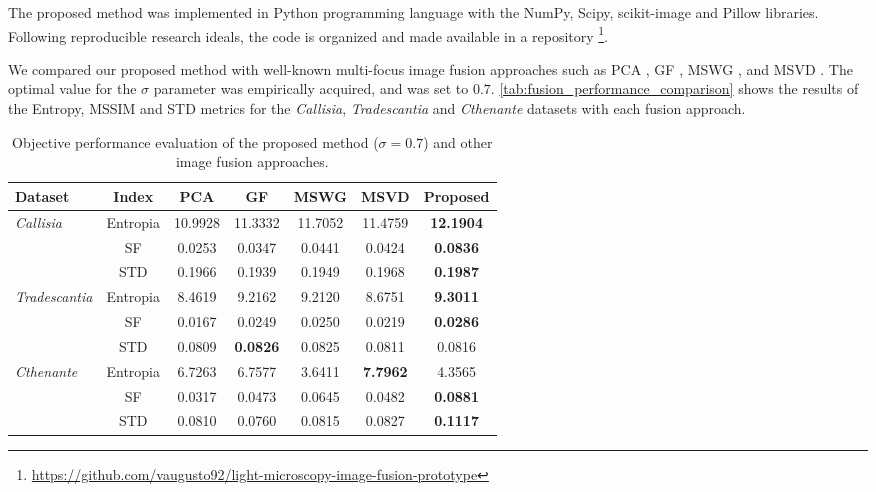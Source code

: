 The proposed method was implemented in Python programming language with the NumPy, Scipy, scikit-image and Pillow libraries. Following reproducible research ideals, the code is organized and made available in a repository \footnote{\url{https://github.com/vaugusto92/light-microscopy-image-fusion-prototype}}.

We compared our proposed method with well-known multi-focus image fusion approaches such as PCA \cite{naidu2008pixel}, GF \cite{li2013image}, MSWG \cite{zhou2014multi}, and MSVD \cite{naidu2011image}. The optimal value for the $\sigma$ parameter was empirically acquired, and was set to $0.7$. \autoref{tab:fusion_performance_comparison} shows the results of the Entropy, MSSIM and STD metrics for the \textit{Callisia}, \textit{Tradescantia} and \textit{Cthenante} datasets with each fusion approach.

\begin{table}[ht]
    \centering
    \caption{Objective performance evaluation of the proposed method ($\sigma = 0.7$) and other image fusion approaches.}
    \label{tab:fusion_performance_comparison}
    \begin{tabular}{lcccccc}
        \toprule
        Dataset & Index & PCA & GF & MSWG & MSVD & \textbf{Proposed}\\
        \midrule
        
        \multirow{3}{*}{\textit{\small Callisia}} 
        & \small Entropia & 10.9928 & 11.3332 & 11.7052 & 11.4759 & \textbf{12.1904}\\
        & \small SF & 0.0253 & 0.0347 & 0.0441 & 0.0424 & \textbf{0.0836}\\
        & \small STD & 0.1966 & 0.1939 & 0.1949 & 0.1968 & \textbf{0.1987}\\
        
        \midrule
        
        \multirow{3}{*}{\textit{\small Tradescantia}}
        & \small Entropia & 8.4619 & 9.2162 & 9.2120 & 8.6751 & \textbf{9.3011}\\
        & \small SF & 0.0167 & 0.0249 & 0.0250 & 0.0219 & \textbf{0.0286}\\
        & \small STD & 0.0809 & \textbf{0.0826} & 0.0825 & 0.0811 & 0.0816\\
        
        \midrule

        \multirow{3}{*}{\textit{\small Cthenante}}
        & \small Entropia & 6.7263 & 6.7577 & 3.6411 & \textbf{7.7962} & 4.3565\\
        & \small SF & 0.0317 & 0.0473 & 0.0645 & 0.0482 & \textbf{0.0881}\\
        & \small STD & 0.0810 & 0.0760 & 0.0815 & 0.0827 & \textbf{0.1117}\\

        \bottomrule
    \end{tabular}
    \centering
    \fautor
\end{table}

